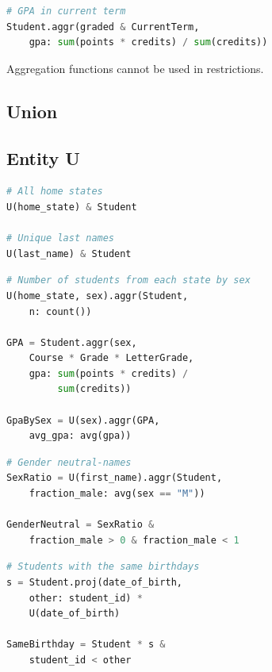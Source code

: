 \documentclass[letter,10pt]{article}
\begin{document}
\begin{lstlisting}[language=Python, caption={Reuse of variables}, label={lst:aggr3}]
# GPA in current term
Student.aggr(graded & CurrentTerm, 
    gpa: sum(points * credits) / sum(credits))
\end{lstlisting}

Aggregation functions cannot be used in restrictions. 

\subsection{Union}\label{sec:union}

\subsection{Entity U}\label{sec:u}
\begin{lstlisting}[language=Python, morekeywords={avg, U}, caption={Creating a new entity.}, label={lst:u1}]
# All home states
U(home_state) & Student

# Unique last names
U(last_name) & Student 
\end{lstlisting}

\begin{lstlisting}[language=Python, morekeywords={avg, U}, caption={Aggregation by a new entity.}, label={lst:u2}]
# Number of students from each state by sex
U(home_state, sex).aggr(Student, 
    n: count())

GPA = Student.aggr(sex,
    Course * Grade * LetterGrade,
    gpa: sum(points * credits) /
         sum(credits))

GpaBySex = U(sex).aggr(GPA, 
    avg_gpa: avg(gpa))
\end{lstlisting}

\begin{lstlisting}[language=Python, morekeywords={avg, U}, caption={Aggregation and restriction.}, label={lst:u3}]
# Gender neutral-names
SexRatio = U(first_name).aggr(Student, 
    fraction_male: avg(sex == "M")) 

GenderNeutral = SexRatio & 
    fraction_male > 0 & fraction_male < 1
\end{lstlisting}

\begin{lstlisting}[language=Python, morekeywords={avg, U}, caption={Elevation of a secondary attribute.}, label={lst:u4} ]
# Students with the same birthdays
s = Student.proj(date_of_birth, 
    other: student_id) * 
    U(date_of_birth)

SameBirthday = Student * s & 
    student_id < other
\end{lstlisting}
\end{document}
